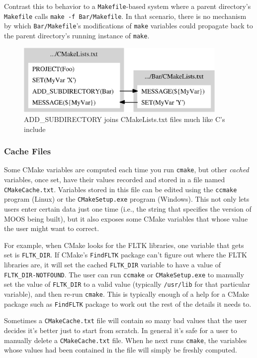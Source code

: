 \documentclass[letterpaper,10pt]{article}
\begin{document}
Contrast this to behavior to a \verb|Makefile|-based system where 
a parent directory's \verb|Makefile| calls \verb|make -f Bar/Makefile|.
In that scenario, there is no mechanism by which \verb|Bar/Makefile|'s
modifications of \verb|make| variables could propagate back to the 
parent directory's running instance of \verb|make|.

\begin{figure}
 \centering
\includegraphics[width=4in]{file-structure.eps}
   \caption{ADD\_SUBDIRECTORY joins CMakeLists.txt files much like C's include}
   \label{fig:cmake-file-structure}
\end{figure}

\subsubsection{Cache Files}
Some CMake variables are computed each time you run \verb|cmake|, but other
\textit{cached} variables, once set, have their values recorded and stored in
a file named \verb|CMakeCache.txt|.  Variables stored in this file can be
edited using the \verb|ccmake| program (Linux) or the \verb|CMakeSetup.exe|
program (Windows).  This not only lets users enter certain data just one time
(i.e., the string that specifies the version of MOOS being built), but it also
exposes some CMake variables that whose value the user might want to correct.

For example, when CMake looks for the FLTK libraries, one variable that gets
set is \verb|FLTK_DIR|.  If CMake's \verb|FindFLTK| package can't figure out
where the FLTK libraries are, it will set the cached \verb|FLTK_DIR| variable
to have a value of \verb|FLTK_DIR-NOTFOUND|.  The user can run \verb|ccmake|
or \verb|CMakeSetup.exe| to manually set the value of \verb|FLTK_DIR| to
a valid value (typically \verb|/usr/lib| for that particular variable), and
then re-run \verb|cmake|.  This is typically enough of a help for a CMake
package such as \verb|FindFLTK| package to work out the rest of the details it
needs to.

Sometimes a \verb|CMakeCache.txt| file will contain so many bad values that
the user decides it's better just to start from scratch.  In general it's
safe for a user to manually delete a \verb|CMakeCache.txt| file.  When he
next runs \verb|cmake|, the variables whose values had been contained in the
file will simply be freshly computed.
\end{document}

